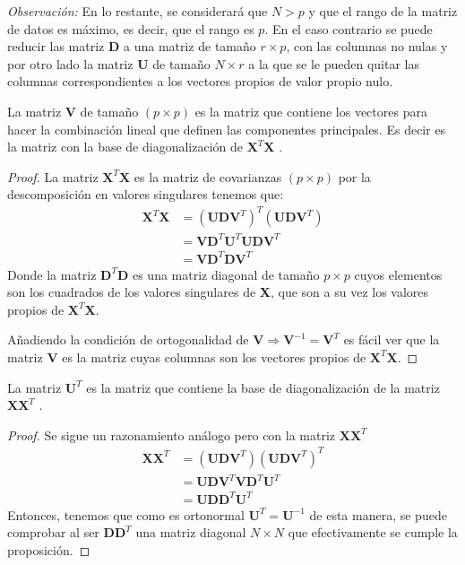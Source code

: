 \noindent \emph{Observación: }En lo restante, se considerará que $N>p$ y que el rango de la matriz de datos es máximo, es decir, que el rango es $p$. En el caso contrario se puede reducir las matriz $\mathbf{D}$ a una matriz de tamaño $r\times p$, con las columnas no nulas y por otro lado la matriz $\mathbf{U}$ de tamaño $N\times r$ a la que se le pueden quitar las columnas correspondientes a los vectores propios de valor propio nulo. 

\noindent 
\begin{propo}
La matriz $\mathbf{V}$ de tamaño $(p\times p)$ es la matriz que contiene los vectores para hacer la combinación lineal que definen las componentes principales. Es decir es la matriz con la base de diagonalización de $\mathbf{X}^T\mathbf{X}$ \cite{Johnson 1963}.
\begin{proof}
La matriz $\textbf{X}^T \textbf{X}$ es la matriz de covarianzas $(p \times p)$  por la descomposición en valores singulares tenemos que:
\begin{align*}
\textbf{X}^T \textbf{X} &= (\textbf{U}\mathbf{D} \textbf{V}^T)^T (\textbf{U}\mathbf{D} \textbf{V}^T)\\
&= \textbf{V}\mathbf{D} ^T \textbf{U}^T \textbf{U}\mathbf{D} \textbf{V}^T\\
&= \textbf{V}\mathbf{D} ^T \mathbf{D} \textbf{V}^T
\end{align*}
Donde la matriz $\mathbf{D} ^T \mathbf{D} $ es una matriz diagonal de tamaño $p \times p $ cuyos elementos son los cuadrados de los valores singulares de \textbf{X}, que son a su vez los valores propios de $\textbf{X}^T \textbf{X}$. 

\noindent Añadiendo la condición de ortogonalidad de $\textbf{V}\Rightarrow \textbf{V}^{-1}=\mathbf{V}^T$ es fácil ver que la matriz \textbf{V} es la matriz cuyas columnas son los vectores propios de $\textbf{X}^T\textbf{X}$.
\end{proof}
\end{propo}

\begin{propo}
La matriz $\mathbf{U}^T$ es la matriz que contiene la base de diagonalización de la matriz $\mathbf{XX}^T$ \cite{Johnson 1963}.  
\begin{proof}
Se sigue un razonamiento análogo pero con la matriz $\mathbf{XX}^T$
\begin{align*}
\textbf{X} \textbf{X}^T  &= (\textbf{U}\mathbf{D} \textbf{V}^T)(\textbf{U}\mathbf{D} \textbf{V}^T)^T\\
&= \mathbf{UDV}^T\mathbf{VD}^T\mathbf{U}^T\\
&= \mathbf{UDD}^T\mathbf{U}^T
\end{align*}
Entonces, tenemos que como es ortonormal $\mathbf{U}^T=\mathbf{U}^{-1}$ de esta manera, se puede comprobar al ser $\mathbf{DD}^T$ una matriz diagonal $N\times N$ que efectivamente se cumple la proposición.\qedhere
\end{proof}
\end{propo}

